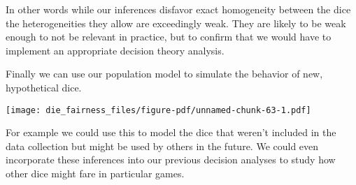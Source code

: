 \documentclass[
  letterpaper,
  DIV=11,
  numbers=noendperiod]{scrartcl}
\newenvironment{Shaded}{\begin{snugshade}}{\end{snugshade}}
\newcommand{\AttributeTok}[1]{\textcolor[rgb]{0.40,0.45,0.13}{#1}}
\newcommand{\ControlFlowTok}[1]{\textcolor[rgb]{0.00,0.23,0.31}{#1}}
\newcommand{\DecValTok}[1]{\textcolor[rgb]{0.68,0.00,0.00}{#1}}
\newcommand{\FloatTok}[1]{\textcolor[rgb]{0.68,0.00,0.00}{#1}}
\newcommand{\FunctionTok}[1]{\textcolor[rgb]{0.28,0.35,0.67}{#1}}
\newcommand{\NormalTok}[1]{\textcolor[rgb]{0.00,0.23,0.31}{#1}}
\newcommand{\OtherTok}[1]{\textcolor[rgb]{0.00,0.23,0.31}{#1}}
\newcommand{\SpecialCharTok}[1]{\textcolor[rgb]{0.37,0.37,0.37}{#1}}
\newcommand{\StringTok}[1]{\textcolor[rgb]{0.13,0.47,0.30}{#1}}
\begin{document}
In other words while our inferences disfavor exact homogeneity between
the dice the heterogeneities they allow are exceedingly weak. They are
likely to be weak enough to not be relevant in practice, but to confirm
that we would have to implement an appropriate decision theory analysis.

Finally we can use our population model to simulate the behavior of new,
hypothetical dice.

\begin{Shaded}
\end{Shaded}

\texttt{[image: die\_fairness\_files/figure-pdf/unnamed-chunk-63-1.pdf]}

For example we could use this to model the dice that weren't included in
the data collection but might be used by others in the future. We could
even incorporate these inferences into our previous decision analyses to
study how other dice might fare in particular games.
\end{document}
